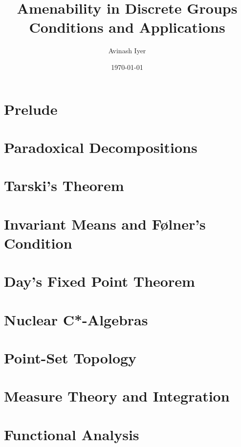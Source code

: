 \documentclass[12pt]{package2}
\title{Amenability in Discrete Groups\\ {\large Conditions and Applications}}
\author{Avinash Iyer}
\date{\today}
\begin{document}
\maketitle
\tableofcontents
\RaggedRight
\chapter{Prelude}
\chapter{Paradoxical Decompositions}

\chapter{Tarski's Theorem}

\chapter{Invariant Means and Følner's Condition}
\chapter{Day's Fixed Point Theorem}
\chapter{Nuclear C*-Algebras}
\appendix
\chapter{Point-Set Topology}

\chapter{Measure Theory and Integration}

\chapter{Functional Analysis}
\nocite{*}
\printbibliography
\end{document}
